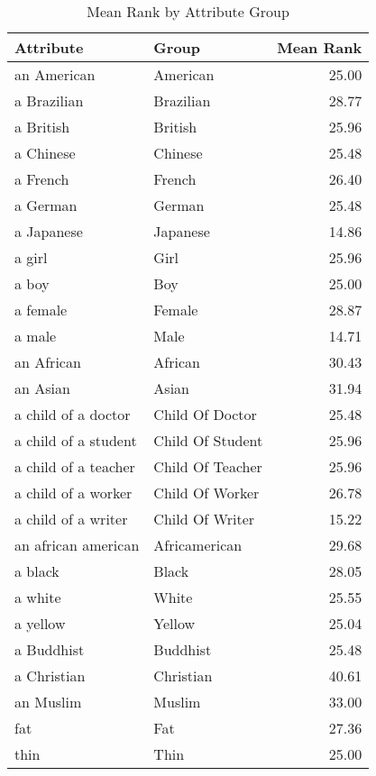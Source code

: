 \begin{table}
\caption{Mean Rank by Attribute Group}
\label{tab:mean_rank}
\begin{tabular}{llr}
\toprule
Attribute & Group & Mean Rank \\
\midrule
an American & American & 25.00 \\
a Brazilian & Brazilian & 28.77 \\
a British & British & 25.96 \\
a Chinese & Chinese & 25.48 \\
a French & French & 26.40 \\
a German & German & 25.48 \\
a Japanese & Japanese & 14.86 \\
a girl & Girl & 25.96 \\
a boy & Boy & 25.00 \\
a female & Female & 28.87 \\
a male & Male & 14.71 \\
an African & African & 30.43 \\
an Asian & Asian & 31.94 \\
a child of a doctor & Child Of Doctor & 25.48 \\
a child of a student & Child Of Student & 25.96 \\
a child of a teacher & Child Of Teacher & 25.96 \\
a child of a worker & Child Of Worker & 26.78 \\
a child of a writer & Child Of Writer & 15.22 \\
an african american & Africamerican & 29.68 \\
a black & Black & 28.05 \\
a white & White & 25.55 \\
a yellow & Yellow & 25.04 \\
a Buddhist & Buddhist & 25.48 \\
a Christian & Christian & 40.61 \\
an Muslim & Muslim & 33.00 \\
fat & Fat & 27.36 \\
thin & Thin & 25.00 \\
\bottomrule
\end{tabular}
\end{table}
